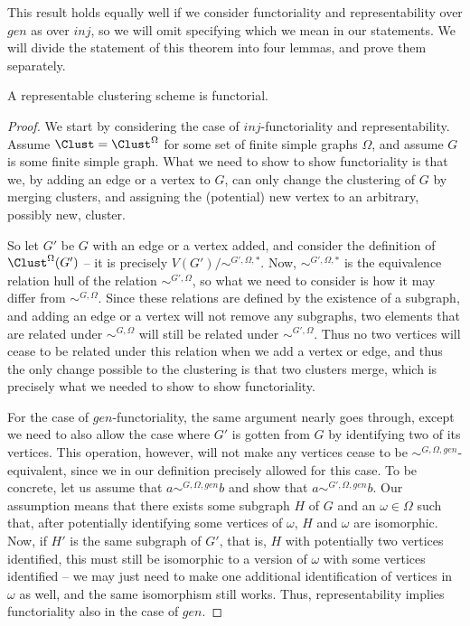 \documentclass[a4paper,reqno,oneside]{article} %
\begin{document}
This result holds equally well if we consider functoriality and representability over $gen$ as over $inj$, so we will omit specifying which we mean in our statements. We will divide the statement of this theorem into four lemmas, and prove them separately.

\begin{lemma}\label{representable_is_functorial}
A representable clustering scheme is functorial.
\begin{proof}
We start by considering the case of $inj$-functoriality and representability. Assume $\Clust = \Clust^\Omega$ for some set of finite simple graphs $\Omega$, and assume $G$ is some finite simple graph. What we need to show to show functoriality is that we, by adding an edge or a vertex to $G$, can only change the clustering of $G$ by merging clusters, and assigning the (potential) new vertex to an arbitrary, possibly new, cluster.

So let $G'$ be $G$ with an edge or a vertex added, and consider the definition of $\Clust^\Omega(G')$ -- it is precisely $V(G')/\sim^{G', \Omega, *}$. Now, $\sim^{G', \Omega, *}$ is the equivalence relation hull of the relation $\sim^{G', \Omega}$, so what we need to consider is how it may differ from $\sim^{G, \Omega}$. Since these relations are defined by the existence of a subgraph, and adding an edge or a vertex will not remove any subgraphs, two elements that are related under $\sim^{G, \Omega}$ will still be related under $\sim^{G', \Omega}$. Thus no two vertices will cease to be related under this relation when we add a vertex or edge, and thus the only change possible to the clustering is that two clusters merge, which is precisely what we needed to show to show functoriality.

For the case of $gen$-functoriality, the same argument nearly goes through, except we need to also allow the case where $G'$ is gotten from $G$ by identifying two of its vertices. This operation, however, will not make any vertices cease to be $\sim^{G, \Omega, gen}$-equivalent, since we in our definition precisely allowed for this case. To be concrete, let us assume that $a \sim^{G, \Omega, gen} b$ and show that $a \sim^{G', \Omega, gen} b$. Our assumption means that there exists some subgraph $H$ of $G$ and an $\omega \in \Omega$ such that, after potentially identifying some vertices of $\omega$, $H$ and $\omega$ are isomorphic. Now, if $H'$ is the same subgraph of $G'$, that is, $H$ with potentially two vertices identified, this must still be isomorphic to a version of $\omega$ with some vertices identified -- we may just need to make one additional identification of vertices in $\omega$ as well, and the same isomorphism still works. Thus, representability implies functoriality also in the case of $gen$. 
\end{proof}
\end{lemma}
\end{document}
